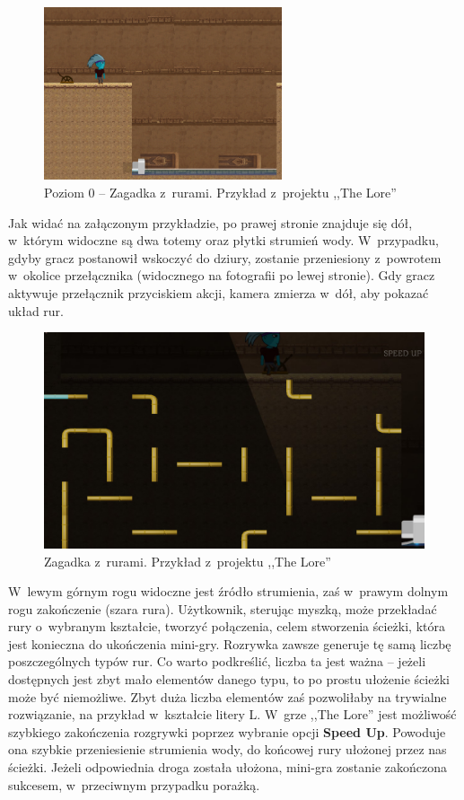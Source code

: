 \documentclass[oneside,polski,logo]{amuthesis}
\begin{document}
\begin{figure}[h]
	\centering
	\includegraphics[width=7cm]{images/tyrek/ruryLvl0.png}
	\caption{Poziom 0 – Zagadka z~rurami. Przykład z~projektu ,,The Lore''}
\end{figure}

Jak widać na załączonym przykładzie, po prawej stronie znajduje się dół, w~którym widoczne są dwa totemy oraz płytki strumień wody. W~przypadku, gdyby gracz postanowił wskoczyć do dziury, zostanie przeniesiony z~powrotem w~okolice przełącznika (widocznego na fotografii po lewej stronie). Gdy gracz aktywuje przełącznik przyciskiem akcji, kamera zmierza w~dół, aby pokazać układ rur.

\begin{figure}[h]
	\centering
	\includegraphics[width=12cm]{images/tyrek/pipes.png}
	\caption{Zagadka z~rurami. Przykład z~projektu ,,The Lore''}
\end{figure}

W~lewym górnym rogu widoczne jest źródło strumienia, zaś w~prawym dolnym rogu zakończenie (szara rura). Użytkownik, sterując myszką, może przekładać rury o~wybranym kształcie, tworzyć połączenia, celem stworzenia ścieżki, która jest konieczna do ukończenia mini-gry. Rozrywka zawsze generuje tę samą liczbę poszczególnych typów rur. Co warto podkreślić, liczba ta jest ważna – jeżeli dostępnych jest zbyt mało elementów danego typu, to po prostu ułożenie ścieżki może być niemożliwe. Zbyt duża liczba elementów zaś pozwoliłaby na trywialne rozwiązanie, na przykład w~kształcie litery L. W~grze ,,The Lore'' jest możliwość szybkiego zakończenia rozgrywki poprzez wybranie opcji \textbf{Speed Up}. Powoduje ona szybkie przeniesienie strumienia wody, do końcowej rury ułożonej przez nas ścieżki. Jeżeli odpowiednia droga została ułożona, mini-gra zostanie zakończona sukcesem, w~przeciwnym przypadku porażką.
\end{document}
